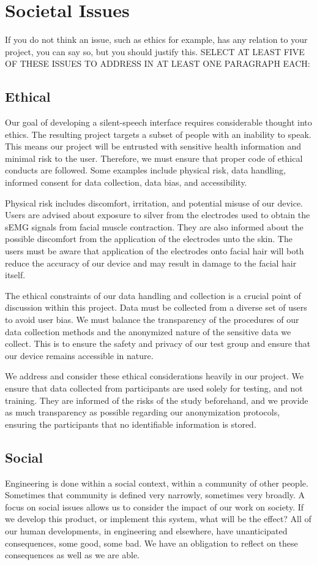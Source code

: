 \chapter{Societal Issues}
If you do not think an issue, such as ethics for example, has any relation to your project, you can say so, but you should justify this. SELECT AT LEAST FIVE OF THESE ISSUES TO ADDRESS IN AT LEAST ONE PARAGRAPH EACH:

\section{Ethical}
Our goal of developing a silent-speech interface requires considerable thought into ethics.
The resulting project targets a subset of people with an inability to speak. This means our project
 will be entrusted with sensitive health information and minimal risk to the user. Therefore, we must
ensure that proper code of ethical conducts are followed. Some examples include physical risk, data 
handling, informed consent for data collection, data bias, and accessibility.

Physical risk includes discomfort, irritation, and potential misuse of our device. Users are advised about
 exposure to silver from the electrodes used to obtain the sEMG signals from facial muscle contraction. They are also
 informed about the possible discomfort from the application of the electrodes unto the skin. The users must be aware
 that application of the electrodes onto facial hair will both reduce the accuracy of our device and may result in 
 damage to the facial hair itself.

The ethical constraints of our data handling and collection is a crucial point of discussion within this project.
 Data must be collected from a diverse set of users to avoid user bias. We must balance the transparency of the procedures 
 of our data collection methods and the anonymized nature of the sensitive data we collect. This is to ensure the safety and privacy
 of our test group and ensure that our device remains accessible in nature.

We address and consider these ethical considerations heavily in our project. We ensure that data collected from participants are used
 solely for testing, and not training. They are informed of the risks of the study beforehand, and we provide as much transparency as
 possible regarding our anonymization protocols, ensuring the participants that no identifiable information is stored.

\section{Social}
Engineering is done within a social context, within a community of other people. Sometimes that community is defined very narrowly, sometimes very broadly. A focus on social issues allows us to consider the impact of our work on society. If we develop this product, or implement this system, what will be the effect? All of our human developments, in engineering and elsewhere, have unanticipated consequences, some good, some bad. We have an obligation to reflect on these consequences as well as we are able.

